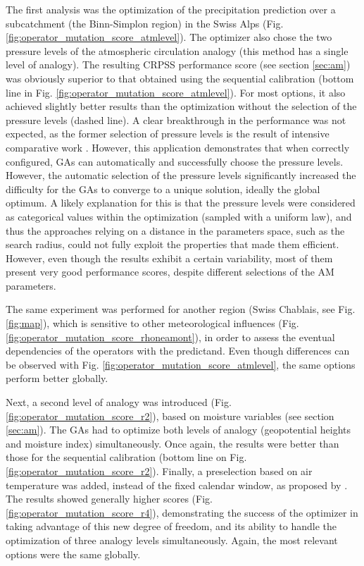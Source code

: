 \documentclass{ametsoc}
\begin{document}
The first analysis was the optimization of the precipitation prediction over a subcatchment (the Binn-Simplon region) in the Swiss Alps (Fig. \ref{fig:operator_mutation_score_atmlevel}). The optimizer also chose the two pressure levels of the atmospheric circulation analogy (this method has a single level of analogy). The resulting CRPSS performance score (see section \ref{sec:am}) was obviously superior to that obtained using the sequential calibration (bottom line in Fig. \ref{fig:operator_mutation_score_atmlevel}). For most options, it also achieved slightly better results than the optimization without the selection of the pressure levels (dashed line). A clear breakthrough in the performance was not expected, as the former selection of pressure levels is the result of intensive comparative work \citep{Bontron2004}. However, this application demonstrates that when correctly configured, GAs can automatically and successfully choose the pressure levels. However, the automatic selection of the pressure levels significantly increased the difficulty for the GAs to converge to a unique solution, ideally the global optimum. A likely explanation for this is that the pressure levels were considered as categorical values within the optimization (sampled with a uniform law), and thus the approaches relying on a distance in the parameters space, such as the search radius, could not fully exploit the properties that made them efficient. However, even though the results exhibit a certain variability, most of them present very good performance scores, despite different selections of the AM parameters.

The same experiment was performed for another region (Swiss Chablais, see Fig. \ref{fig:map}), which is sensitive to other meteorological influences (Fig. \ref{fig:operator_mutation_score_rhoneamont}), in order to assess the eventual dependencies of the operators with the predictand. Even though differences can be observed with Fig. \ref{fig:operator_mutation_score_atmlevel}, the same options perform better globally.

Next, a second level of analogy was introduced (Fig. \ref{fig:operator_mutation_score_r2}), based on moisture variables (see section \ref{sec:am}). The GAs had to optimize both levels of analogy (geopotential heights and moisture index) simultaneously. Once again, the results were better than those for the sequential calibration (bottom line on Fig. \ref{fig:operator_mutation_score_r2}). Finally, a preselection based on air temperature was added, instead of the fixed calendar window, as proposed by \cite{BenDaoud2016}. The results showed generally higher scores (Fig. \ref{fig:operator_mutation_score_r4}), demonstrating the success of the optimizer in taking advantage of this new degree of freedom, and its ability to handle the optimization of three analogy levels simultaneously. Again, the most relevant options were the same globally.
\end{document}
